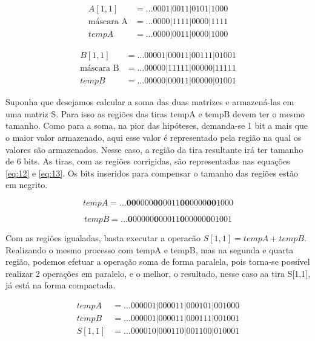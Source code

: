 \documentclass[12pt]{article}
\begin{document}
  \begin{align*}
   A[1,1]			&=	\ldots0001|0011|0101|1000\\
   \text{máscara A}	&=	\ldots0000|1111|0000|1111\\
   tempA 			&=	\ldots0000|0011|0000|1000
  \end{align*}

  \begin{align*}
   B[1,1]			&= \ldots00001|00011|00111|01001 \\
   \text{máscara B}	&= \ldots00000|11111|00000|11111 \\
   tempB 			&= \ldots00000|00011|00000|01001
  \end{align*}

Suponha que desejamos calcular a soma das duas matrizes e armazená-las em uma
matriz S. Para isso as regiões das tiras tempA e tempB devem ter o mesmo
tamanho. Como para a soma, na pior das hipóteses, demanda-se 1 bit a mais que o
maior valor armazenado, aqui esse valor é representado pela região na qual os
valores são armazenados. Nesse caso, a região da tira resultante irá ter tamanho
de 6 bits. As tiras, com as regiões corrigidas, são representadas nas equações
\ref{eq:12} e \ref{eq:13}. Os bits inseridos para compensar o tamanho das
regiões estão em negrito.

\begin{equation}\label{eq:12}
tempA =  \ldots\textbf{00}0000\textbf{00}0011\textbf{00}0000\textbf{00}1000
\end{equation}

\begin{equation}\label{eq:13}
tempB =  \ldots\textbf{0}00000\textbf{0}00011\textbf{0}00000\textbf{0}01001
\end{equation}

Com as regiões igualadas, basta executar a operacão $S[1,1] = tempA + tempB$.
Realizando o mesmo processo com tempA e tempB, mas na segunda e quarta região,
podemos efetuar a operação soma de forma paralela, pois torna-se possível
realizar 2 operações em paralelo, e o melhor, o resultado, nesse caso aa tira
S[1,1], já está na forma compactada.

\begin{align*}
 tempA&= \ldots000001|000011|000101|001000\\
 tempB&= \ldots000001|000011|000111|001001\\
 S[1,1]&=\ldots000010|000110|001100|010001
\end{align*}
\end{document}
